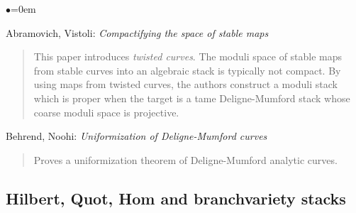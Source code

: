 \begin{list}{$\bullet$}{\leftmargin=0em}
\item Abramovich, Vistoli:  \emph{Compactifying the space of stable maps}
\cite{abramovich-vistoli}
\begin{quote}
This paper introduces \emph{twisted curves}.  The moduli space of stable
maps from stable curves into an algebraic stack is typically not compact.
By using maps from twisted curves, the authors construct a moduli stack
which is proper when the target is a tame Deligne-Mumford stack whose
coarse moduli space is projective.
\end{quote}
\smallskip
\item Behrend, Noohi: \emph{Uniformization of Deligne-Mumford curves}
\cite{behrend-noohi}
\begin{quote}
Proves a uniformization theorem of Deligne-Mumford analytic curves.
\end{quote}
\end{list}

\subsection{Hilbert, Quot, Hom and branchvariety stacks}
\label{subsection-hilbert-quot-hom}

